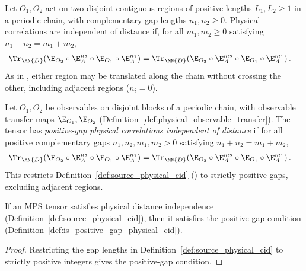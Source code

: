 \begin{definition}%
    \label{def:source_physical_cid}
    \leanok
    Let $O_1,O_2$ act on two disjoint contiguous regions of positive lengths
    $L_1,L_2\geq1$ in a periodic chain, with complementary gap lengths
    $n_1,n_2\geq0$. Physical correlations are independent of distance if, for
    all $m_1,m_2\geq0$ satisfying $n_1+n_2=m_1+m_2$,
    \begin{align}
        \Tr_{\MN{D}}\!\left(\E_{O_2}\circ\E_A^{n_2}\circ\E_{O_1}\circ\E_A^{n_1}\right)
         & =
        \Tr_{\MN{D}}\!\left(\E_{O_2}\circ\E_A^{m_2}\circ\E_{O_1}\circ\E_A^{m_1}\right).
        \notag
    \end{align}
    As in \cite[Definition~3.3]{Cirac2016MPDO_arXiv}, either region may be
    translated along the chain without crossing the other, including adjacent
    regions ($n_i=0$).
\end{definition}

\begin{definition}%
    \label{def:is_positive_gap_physical_cid}
    \leanok
    Let $O_1,O_2$ be observables on disjoint blocks of a periodic chain, with
    observable transfer maps $\E_{O_1},\E_{O_2}$
    (Definition~\ref{def:physical_observable_transfer}). The tensor has
    \emph{positive-gap physical correlations independent of distance} if for
    all positive complementary gaps $n_1,n_2,m_1,m_2>0$ satisfying
    $n_1+n_2=m_1+m_2$,
    \begin{align}
        \Tr_{\MN{D}}\!\left(\E_{O_2}\circ\E_A^{n_2}\circ\E_{O_1}\circ\E_A^{n_1}\right)
         & =
        \Tr_{\MN{D}}\!\left(\E_{O_2}\circ\E_A^{m_2}\circ\E_{O_1}\circ\E_A^{m_1}\right).
        \notag
    \end{align}
    This restricts Definition~\ref{def:source_physical_cid}
    (\cite[Definition~3.3]{Cirac2016MPDO_arXiv}) to strictly positive gaps,
    excluding adjacent regions.
\end{definition}

\begin{lemma}%
    \label{lem:is_positive_gap_physical_cid_of_physical_cid}
    \leanok
    If an MPS tensor satisfies physical distance independence
    (Definition~\ref{def:source_physical_cid}), then it satisfies the
    positive-gap condition
    (Definition~\ref{def:is_positive_gap_physical_cid}).
\end{lemma}
\begin{proof}\leanok
    Restricting the gap lengths in Definition~\ref{def:source_physical_cid} to
    strictly positive integers gives the positive-gap condition.
\end{proof}

